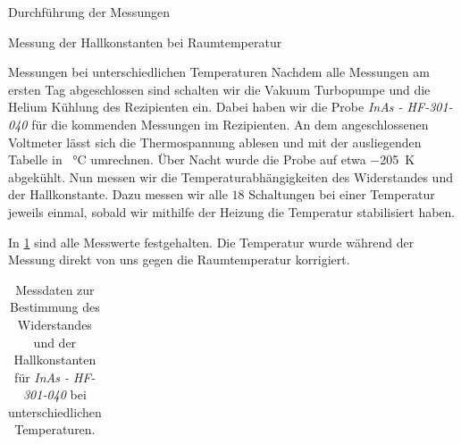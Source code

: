\documentclass[pdftex, a4paper,11pt, twoside, ngerman]{report}
\begin{document}
\begin{chapter}{Durchführung der Messungen}
\begin{section}{Messung der Hallkonstanten bei Raumtemperatur}
      
    \end{section}
    
    
    
    \begin{section}{Messungen bei unterschiedlichen Temperaturen}
      \label{chp:MessungUnterschiedlicheTemperaturen}
      Nachdem alle Messungen am ersten Tag abgeschlossen sind schalten wir die
      Vakuum Turbopumpe und die Helium Kühlung des Rezipienten ein.
      Dabei haben wir die Probe \textit{InAs - HF-301-040} für die kommenden
      Messungen im Rezipienten.
      An dem angeschlossenen Voltmeter lässt sich die Thermospannung ablesen
      und mit der ausliegenden Tabelle in \SI{}{\celsius} umrechnen.
      Über Nacht wurde die Probe auf etwa \SI{-205}{\kelvin} abgekühlt.
      Nun messen wir die Temperaturabhängigkeiten des Widerstandes und der
      Hallkonstante. Dazu messen wir alle $18$ Schaltungen bei einer Temperatur
      jeweils einmal, sobald wir mithilfe der Heizung die Temperatur
      stabilisiert haben.
      
      
      In \cref{tab:TemperaturInAs} sind alle Messwerte
      festgehalten. Die Temperatur wurde während der Messung direkt von
      uns gegen die Raumtemperatur korrigiert.
      \begin{table}
        \centering
        \footnotesize
        \begin{tabular}{c c c c c c c c c c c c c c c}
          
        \end{tabular}
        \caption{Messdaten zur Bestimmung des Widerstandes und der 
            Hallkonstanten für \textit{InAs - HF-301-040} bei
            unterschiedlichen Temperaturen.}
        \label{tab:TemperaturInAs}
      \end{table}
      
      
    \end{section}
   
    
    
  \end{chapter}
  
  
  
\end{document}

